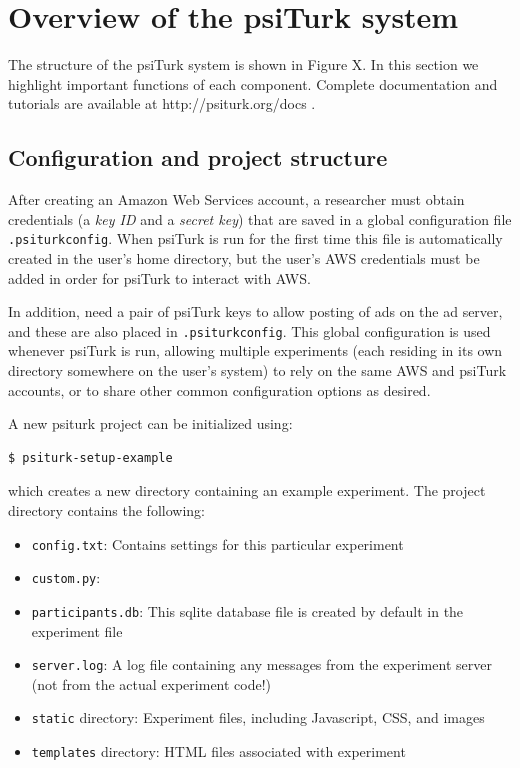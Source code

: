 \documentclass[twocolumn]{svjour3}          %
\begin{document}
\section{Overview of the psiTurk system}

The structure of the psiTurk system is shown in Figure X.
In this section we highlight important functions of each component.
Complete documentation and tutorials are available at http://psiturk.org/docs .

\subsection{Configuration and project structure}

After creating an Amazon Web Services account, a researcher must obtain credentials (a \emph{key ID} and a \emph{secret key}) that are saved in a global configuration file \texttt{.psiturkconfig}.
When psiTurk is run for the first time this file is automatically created in the user's home directory, but the user's AWS credentials must be added in order for psiTurk to interact with AWS.

In addition, need a pair of psiTurk keys to allow posting of ads on the ad server, and these are also placed in \texttt{.psiturkconfig}.
This global configuration is used whenever psiTurk is run, allowing multiple experiments (each residing in its own directory somewhere on the user's system) to rely on the same AWS and psiTurk accounts, or to share other common configuration options as desired.

A new psiturk project can be initialized using:

\begin{lstlisting}
$ psiturk-setup-example
\end{lstlisting}

\noindent which creates a new directory containing an example experiment.
The project directory contains the following:

\begin{itemize}
\item \texttt{config.txt}: Contains settings for this particular experiment
\item \texttt{custom.py}: 
\item \texttt{participants.db}: This sqlite database file is created by default in the experiment file
\item \texttt{server.log}: A log file containing any messages from the experiment server (not from the actual experiment code!)
\item \texttt{static} directory: Experiment files, including Javascript, CSS, and images
\item \texttt{templates} directory: HTML files associated with experiment
\end{itemize}
\end{document}
